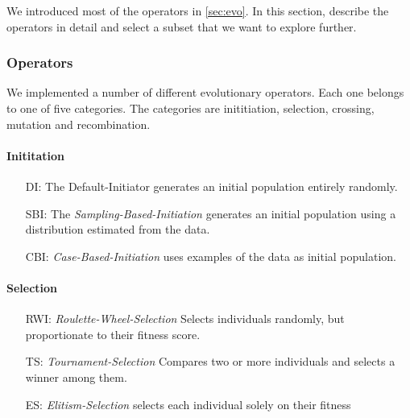 \documentclass[./../../paper.tex]{subfiles}
\begin{document}



We introduced most of the operators in \autoref{sec:evo}. In this section, describe the operators in detail and select a subset that we want to explore further. 

\subsubsection{Operators}
We implemented a number of different evolutionary operators. Each one belongs to one of five categories. The categories are inititiation, selection, crossing, mutation and recombination.  

\paragraph{Inititation}
\begin{enumerate}
    \item[DI:] The Default-Initiator generates an initial population entirely randomly. 
    \item[SBI:] The \emph{Sampling-Based-Initiation} generates an initial population using a distribution estimated from the data. 
    \item[CBI:] \emph{Case-Based-Initiation} uses examples of the data as initial population. 
\end{enumerate}

\paragraph{Selection}
\begin{enumerate}
    \item[RWI:] \emph{Roulette-Wheel-Selection} Selects individuals randomly, but proportionate to their fitness score. 
    \item[TS:] \emph{Tournament-Selection} Compares two or more individuals and selects a winner among them. 
    \item[ES:] \emph{Elitism-Selection} selects each individual solely on their fitness 
\end{enumerate}
\end{document}
